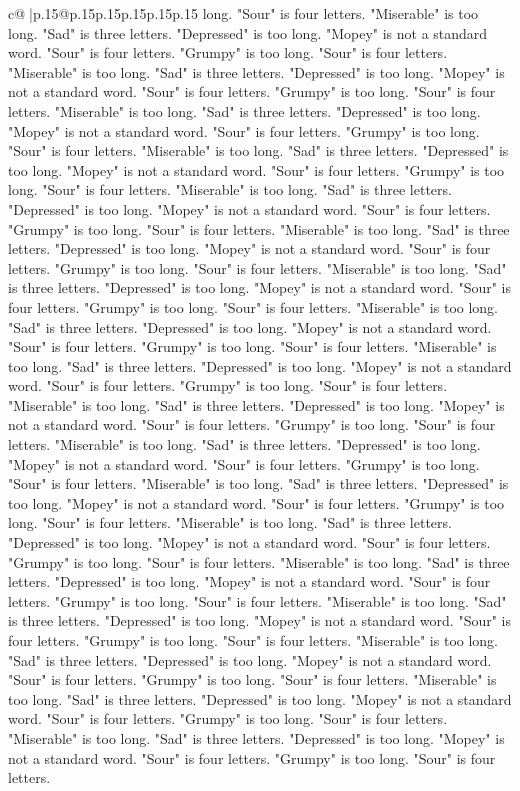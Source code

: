 \documentclass{article}
\begin{document}
{\begin{supertabular}{c@{$\;$}|p{.15\linewidth}@{}p{.15\linewidth}p{.15\linewidth}p{.15\linewidth}p{.15\linewidth}p{.15\linewidth}}
{{{long. "Sour" is four letters. "Miserable" is too long. "Sad" is three letters. "Depressed" is too long. "Mopey" is not a standard word. "Sour" is four letters. "Grumpy" is too long. "Sour" is four letters. "Miserable" is too long. "Sad" is three letters. "Depressed" is too long. "Mopey" is not a standard word. "Sour" is four letters. "Grumpy" is too long. "Sour" is four letters. "Miserable" is too long. "Sad" is three letters. "Depressed" is too long. "Mopey" is not a standard word. "Sour" is four letters. "Grumpy" is too long. "Sour" is four letters. "Miserable" is too long. "Sad" is three letters. "Depressed" is too long. "Mopey" is not a standard word. "Sour" is four letters. "Grumpy" is too long. "Sour" is four letters. "Miserable" is too long. "Sad" is three letters. "Depressed" is too long. "Mopey" is not a standard word. "Sour" is four letters. "Grumpy" is too long. "Sour" is four letters. "Miserable" is too long. "Sad" is three letters. "Depressed" is too long. "Mopey" is not a standard word. "Sour" is four letters. "Grumpy" is too long. "Sour" is four letters. "Miserable" is too long. "Sad" is three letters. "Depressed" is too long. "Mopey" is not a standard word. "Sour" is four letters. "Grumpy" is too long. "Sour" is four letters. "Miserable" is too long. "Sad" is three letters. "Depressed" is too long. "Mopey" is not a standard word. "Sour" is four letters. "Grumpy" is too long. "Sour" is four letters. "Miserable" is too long. "Sad" is three letters. "Depressed" is too long. "Mopey" is not a standard word. "Sour" is four letters. "Grumpy" is too long. "Sour" is four letters. "Miserable" is too long. "Sad" is three letters. "Depressed" is too long. "Mopey" is not a standard word. "Sour" is four letters. "Grumpy" is too long. "Sour" is four letters. "Miserable" is too long. "Sad" is three letters. "Depressed" is too long. "Mopey" is not a standard word. "Sour" is four letters. "Grumpy" is too long. "Sour" is four letters. "Miserable" is too long. "Sad" is three letters. "Depressed" is too long. "Mopey" is not a standard word. "Sour" is four letters. "Grumpy" is too long. "Sour" is four letters. "Miserable" is too long. "Sad" is three letters. "Depressed" is too long. "Mopey" is not a standard word. "Sour" is four letters. "Grumpy" is too long. "Sour" is four letters. "Miserable" is too long. "Sad" is three letters. "Depressed" is too long. "Mopey" is not a standard word. "Sour" is four letters. "Grumpy" is too long. "Sour" is four letters. "Miserable" is too long. "Sad" is three letters. "Depressed" is too long. "Mopey" is not a standard word. "Sour" is four letters. "Grumpy" is too long. "Sour" is four letters. "Miserable" is too long. "Sad" is three letters. "Depressed" is too long. "Mopey" is not a standard word. "Sour" is four letters. "Grumpy" is too long. "Sour" is four letters. "Miserable" is too long. "Sad" is three letters. "Depressed" is too long. "Mopey" is not a standard word. "Sour" is four letters. "Grumpy" is too long. "Sour" is four letters. "Miserable" is too long. "Sad" is three letters. "Depressed" is too long. "Mopey" is not a standard word. "Sour" is four letters. "Grumpy" is too long. "Sour" is four letters. }}}
\end{supertabular}}
\end{document}
